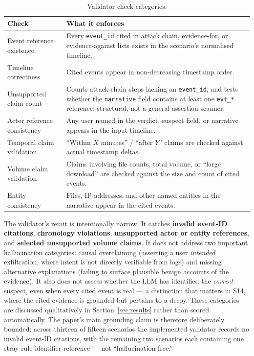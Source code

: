 \documentclass[conference]{IEEEtran}
\begin{document}
\begin{table}[ht]
\centering
\caption{Validator check categories.}
\label{tab:validator}
\small
\begin{tabular}{L{0.32\columnwidth}L{0.60\columnwidth}}
\toprule
\textbf{Check} & \textbf{What it enforces} \\
\midrule
Event reference existence & Every \texttt{event\_id} cited in attack chain, evidence-for, or evidence-against lists exists in the scenario's normalised timeline. \\
Timeline correctness & Cited events appear in non-decreasing timestamp order. \\
Unsupported claim count & Counts attack-chain steps lacking an \texttt{event\_id}, and tests whether the \texttt{narrative} field contains at least one \texttt{evt\_*} reference; structural, not a general assertion scanner. \\
Actor reference consistency & Any user named in the verdict, suspect field, or narrative appears in the input timeline. \\
Temporal claim validation & ``Within $X$ minutes'' / ``after $Y$'' claims are checked against actual timestamp deltas. \\
Volume claim validation & Claims involving file counts, total volume, or ``large download'' are checked against the size and count of cited events. \\
Entity consistency & Files, IP addresses, and other named entities in the narrative appear in the cited events. \\
\bottomrule
\end{tabular}
\end{table}

The validator's remit is intentionally narrow. It catches \textbf{invalid event-ID citations}, \textbf{chronology violations}, \textbf{unsupported actor or entity references}, and \textbf{selected unsupported volume claims}. It does not address two important hallucination categories: causal overclaiming (asserting a user \emph{intended} exfiltration, where intent is not directly verifiable from logs) and missing alternative explanations (failing to surface plausible benign accounts of the evidence). It also does not assess whether the LLM has identified the \emph{correct} suspect, even when every cited event is real --- a distinction that matters in S14, where the cited evidence is grounded but pertains to a decoy. These categories are discussed qualitatively in Section~\ref{sec:results} rather than scored automatically. The paper's main grounding claim is therefore deliberately bounded: across thirteen of fifteen scenarios the implemented validator records no invalid event-ID citations, with the remaining two scenarios each containing one stray rule-identifier reference --- not ``hallucination-free.''
\end{document}

